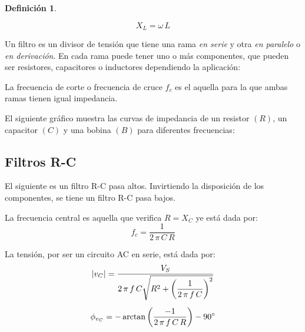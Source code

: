 \documentclass[a5paper,12pt,twoside]{book}
\newtheorem{defn}{{Definición}}[chapter]
\begin{document}
\begin{mdframed}[style=MyFrame1]
    \begin{defn}
    \end{defn}
    \begin{equation*}
        X_L = \omega \, L
    \end{equation*}
\end{mdframed}

Un filtro es un divisor de tensión que tiene una rama \emph{en serie} y otra \emph{en paralelo} o \emph{en derivación}. En cada rama puede tener uno o más componentes, que pueden ser resistores, capacitores o inductores dependiendo la aplicación:

\begin{center}
    \def\svgwidth{0.6\linewidth}
    
\end{center}

La frecuencia de corte o frecuencia de cruce $f_c$ es el aquella para la que ambas ramas tienen igual impedancia.

El siguiente gráfico muestra las curvas de impedancia de un resistor $(R)$, un capacitor $(C)$ y una bobina $(B)$ para diferentes frecuencias:

\begin{center}
    \def\svgwidth{0.7\linewidth}
    
\end{center}


\subsection*{Filtros R-C}

El siguiente es un filtro R-C pasa altos. Invirtiendo la disposición de los componentes, se tiene un filtro R-C pasa bajos.

\begin{center}
    \def\svgwidth{0.6\linewidth}
    
\end{center}

La frecuencia central es aquella que verifica $R = X_C$ ye está dada por:
\begin{equation*}
    f_c = \frac{1}{2 \, \pi \, C \, R}
\end{equation*}

La tensión, por ser un circuito AC en serie, está dada por:
\begin{gather*}
    {\left| {v_C} \right|} = \frac{V_S}{2 \, \pi \, f \, C \sqrt{R^2 + \left(\dfrac{1}{2 \, \pi \, f \, C}\right)^2}}
    \\[1ex]
    \phi_{v_C} = - \arctan{\left(\dfrac{-1}{2 \, \pi \, f \, C \, R}\right)} - \ang{90}
\end{gather*}
\end{document}

